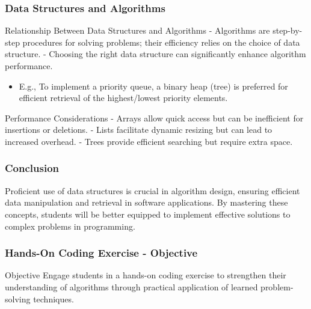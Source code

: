 \documentclass{beamer}
\begin{document}
\begin{frame}
    \frametitle{Data Structures and Algorithms}
    \begin{block}{Relationship Between Data Structures and Algorithms}
        - Algorithms are step-by-step procedures for solving problems; their efficiency relies on the choice of data structure.
        - Choosing the right data structure can significantly enhance algorithm performance.
        \begin{itemize}
            \item E.g., To implement a priority queue, a binary heap (tree) is preferred for efficient retrieval of the highest/lowest priority elements.
        \end{itemize}
    \end{block}

    \begin{block}{Performance Considerations}
        - Arrays allow quick access but can be inefficient for insertions or deletions.
        - Lists facilitate dynamic resizing but can lead to increased overhead.
        - Trees provide efficient searching but require extra space.
    \end{block}
\end{frame}

\begin{frame}
    \frametitle{Conclusion}
    Proficient use of data structures is crucial in algorithm design, ensuring efficient data manipulation and retrieval in software applications. 
    By mastering these concepts, students will be better equipped to implement effective solutions to complex problems in programming.
\end{frame}

\begin{frame}[fragile]
    \frametitle{Hands-On Coding Exercise - Objective}
    \begin{block}{Objective}
        Engage students in a hands-on coding exercise to strengthen their understanding of algorithms through practical application of learned problem-solving techniques.
    \end{block}
\end{frame}
\end{document}
